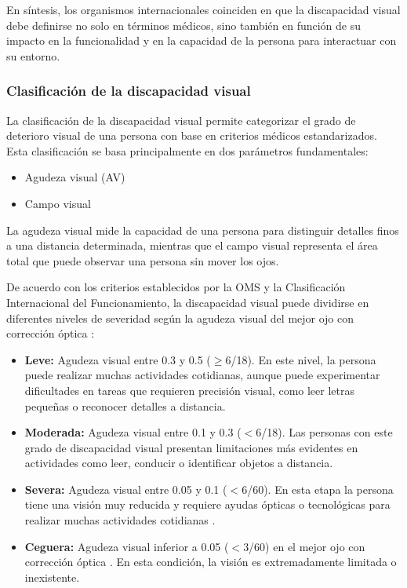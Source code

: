En síntesis, los organismos internacionales coinciden en que la discapacidad visual debe definirse no solo en términos médicos, sino también en función de su impacto en la funcionalidad y en la capacidad de la persona para interactuar con su entorno.

\subsubsection{Clasificación de la discapacidad visual}
La clasificación de la discapacidad visual permite categorizar el grado de deterioro visual de una persona con base en criterios médicos estandarizados. Esta clasificación se basa principalmente en dos parámetros fundamentales:
\begin{itemize}
    \item Agudeza visual (AV)
    \item Campo visual
\end{itemize}

La agudeza visual mide la capacidad de una persona para distinguir detalles finos a una distancia determinada, mientras que el campo visual representa el área total que puede observar una persona sin mover los ojos.

De acuerdo con los criterios establecidos por la OMS y la Clasificación Internacional del Funcionamiento, la discapacidad visual puede dividirse en diferentes niveles de severidad según la agudeza visual del mejor ojo con corrección óptica \cite{once_bajavision}:
\begin{itemize}
    \item \textbf{Leve:} Agudeza visual entre 0.3 y 0.5 ($\geq$6/18). En este nivel, la persona puede realizar muchas actividades cotidianas, aunque puede experimentar dificultades en tareas que requieren precisión visual, como leer letras pequeñas o reconocer detalles a distancia.
    \item \textbf{Moderada:} Agudeza visual entre 0.1 y 0.3 ($<$6/18). Las personas con este grado de discapacidad visual presentan limitaciones más evidentes en actividades como leer, conducir o identificar objetos a distancia.
    \item \textbf{Severa:} Agudeza visual entre 0.05 y 0.1 ($<$6/60). En esta etapa la persona tiene una visión muy reducida y requiere ayudas ópticas o tecnológicas para realizar muchas actividades cotidianas \cite{once_bajavision}.
    \item \textbf{Ceguera:} Agudeza visual inferior a 0.05 ($<$3/60) en el mejor ojo con corrección óptica \cite{once_bajavision}. En esta condición, la visión es extremadamente limitada o inexistente.
\end{itemize}

